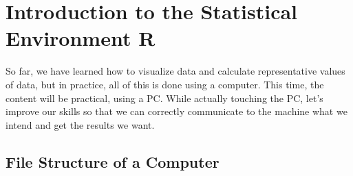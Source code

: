 \documentclass{ltjsbook}
\begin{document}
\VerbatimFootnotes
\chapter{Introduction to the Statistical Environment R}
\label{m03_introR}
So far, we have learned how to visualize data and calculate representative values of data, but in practice, all of this is done using a computer.
This time, the content will be practical, using a PC. While actually touching the PC, let's improve our skills so that we can correctly communicate to the machine what we intend and get the results we want.

\section{File Structure of a Computer}
\end{document}
